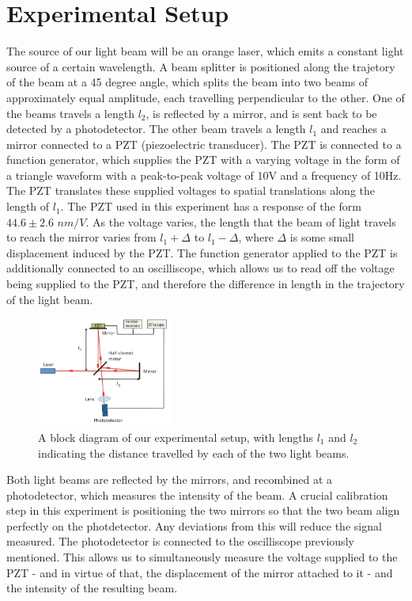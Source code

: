   \section{Experimental Setup}
  The source of our light beam will be an orange laser, which emits a constant light source of a certain wavelength. A beam splitter is positioned along the trajetory of the beam at a 45 degree angle, which splits the beam into two beams of approximately equal amplitude, each travelling perpendicular to the other. One of the beams travels a length $l_2$, is reflected by a mirror, and is sent back to be detected by a photodetector. The other beam travels a length $l_1$ and reaches a mirror connected to a PZT (piezoelectric transducer). The PZT is connected to a function generator, which supplies the PZT with a varying voltage in the form of a triangle waveform with a peak-to-peak voltage of 10V and a frequency of 10Hz. The PZT translates these supplied voltages to spatial translations along the length of $l_1$. The PZT used in this experiment has a response of the form $44.6 \pm 2.6$ $nm/V$. As the voltage varies, the length that the beam of light travels to reach the mirror varies from $l_1 + \Delta$ to $l_1 - \Delta$, where $\Delta$ is some small displacement induced by the PZT. The function generator applied to the PZT is additionally connected to an oscilliscope, which allows us to read off the voltage being supplied to the PZT, and therefore the difference in length in the trajectory of the light beam.
  \\
  \begin{figure}[t]
    \includegraphics[width=0.4\textwidth]{setup.png}
    \caption{A block diagram of our experimental setup, with lengths $l_1$ and $l_2$ indicating the distance travelled by each of the two light beams.}
  \end{figure}
  Both light beams are reflected by the mirrors, and recombined at a photodetector, which measures the intensity of the beam. A crucial calibration step in this experiment is positioning the two mirrors so that the two beam align perfectly on the photdetector. Any deviations from this will reduce the signal measured. The photodetector is connected to the oscilliscope previously mentioned. This allows us to simultaneously measure the voltage supplied to the PZT - and in virtue of that, the displacement of the mirror attached to it - and the intensity of the resulting beam.
